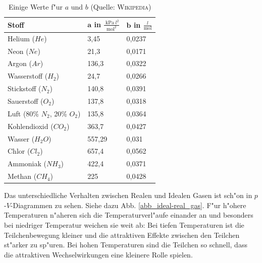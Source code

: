 \begin{table}
   \centering
   \begin{tabular}[c]{l | l | l}
      \toprule
      \textbf{Stoff} & $\mathbf a$ in $\frac{\operatorname{kPa}
        l^2}{\operatorname{mol}^2}$ & $\mathbf b$ in
      $\frac{l}{\operatorname{mol}}$ \\
      \midrule
      Helium ($He$)& 3,45 & 0,0237\\
      Neon ($Ne$)& 21,3 & 0,0171\\ 
      Argon ($Ar$)& 136,3 & 0,0322\\
      Wasserstoff ($H_2$)& 24,7 & 0,0266\\
      Stickstoff ($N_2$)& 140,8 & 0,0391\\
      Sauerstoff ($O_2$)& 137,8 & 0,0318\\
      Luft (80\% $N_2$, 20\% $O_2$)& 135,8 & 0,0364\\
      Kohlendioxid ($CO_2$)& 363,7 & 0,0427\\
      Wasser ($H_2O$)& 557,29 & 0,031\\
      Chlor ($Cl_2$)& 657,4 & 0,0562\\
      Ammoniak ($NH_3$)& 422,4 & 0,0371\\
      Methan ($CH_4$)& 225 & 0,0428 \\
      \bottomrule
   \end{tabular}
   \caption{Einige Werte f"ur $a$ und $b$ (Quelle: \textsc{Wikipedia})}
   \label{tab_werte-ab}
\end{table}

\bigskip 

\noindent
Das unterschiedliche Verhalten zwischen Realen und Idealen Gasen ist
sch"on in $p$-$V$-Diagrammen zu sehen. Siehe dazu
Abb. \ref{abb_ideal-real_gas}.  F"ur h"ohere Temperaturen n"aheren sich
die Temperaturverl"aufe einander an und besonders bei niedriger
Temperatur weichen sie weit ab: Bei tiefen Temperaturen ist die
Teilchenbewegung kleiner und die attraktiven Effekte zwischen den
Teilchen st"arker zu sp"uren. Bei hohen Temperaturen sind die Teilchen
so schnell, dass die attraktiven Wechselwirkungen eine kleinere Rolle spielen.



